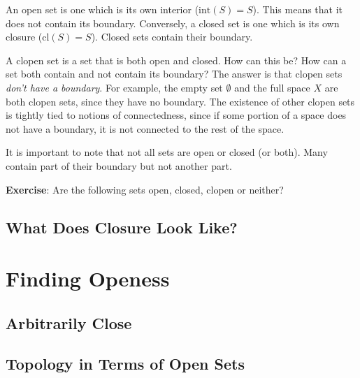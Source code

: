\documentclass{report}
\newcommand{\cl}{\mathrm{cl}}
\newcommand{\intr}{\mathrm{int}}
\begin{document}
An open set is one which is its own interior ($\intr(S) = S$). This means that it does not contain its boundary. Conversely, a closed set is one which is its own closure ($\cl(S) = S$). Closed sets contain their boundary.

A clopen set is a set that is both open and closed. How can this be? How can a set both contain and not contain its boundary? The answer is that clopen sets \emph{don't have a boundary}. For example, the empty set $∅$ and the full space $X$ are both clopen sets, since they have no boundary. The existence of other clopen sets is tightly tied to notions of connectedness, since if some portion of a space does not have a boundary, it is not connected to the rest of the space.

It is important to note that not all sets are open or closed (or both). Many contain part of their boundary but not another part.

{\bf Exercise}: Are the following sets open, closed, clopen or neither?


\section{What Does Closure Look Like?}

\chapter{Finding Openess}

\section{Arbitrarily Close}

\section{Topology in Terms of Open Sets}
\end{document}
